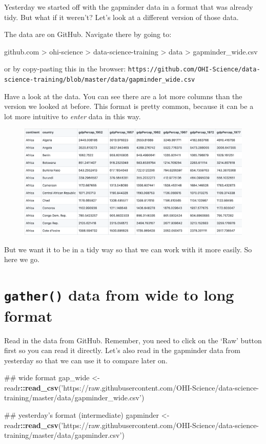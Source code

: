 \documentclass[]{book}
\newenvironment{Shaded}{\begin{snugshade}}{\end{snugshade}}
\newcommand{\KeywordTok}[1]{\textcolor[rgb]{0.13,0.29,0.53}{\textbf{#1}}}
\newcommand{\StringTok}[1]{\textcolor[rgb]{0.31,0.60,0.02}{#1}}
\newcommand{\OperatorTok}[1]{\textcolor[rgb]{0.81,0.36,0.00}{\textbf{#1}}}
\newcommand{\NormalTok}[1]{#1}
\theoremstyle{definition}
\theoremstyle{definition}
\theoremstyle{definition}
\theoremstyle{remark}
\begin{document}
Yesterday we started off with the gapminder data in a format that was
already tidy. But what if it weren't? Let's look at a different version
of those data.

The data are on GitHub. Navigate there by going to:

github.com \textgreater{} ohi-science \textgreater{}
data-science-training \textgreater{} data \textgreater{}
gapminder\_wide.csv

or by copy-pasting this in the browser:
\texttt{https://github.com/OHI-Science/data-science-training/blob/master/data/gapminder\_wide.csv}

Have a look at the data. You can see there are a lot more columns than
the version we looked at before. This format is pretty common, because
it can be a lot more intuitive to \emph{enter} data in this way.

\begin{figure}
\centering
\includegraphics{img/gapminder_wide_gh.png}
\caption{}
\end{figure}

But we want it to be in a tidy way so that we can work with it more
easily. So here we go.

\section{\texorpdfstring{\texttt{gather()} data from wide to long
format}{gather() data from wide to long format}}\label{gather-data-from-wide-to-long-format}

Read in the data from GitHub. Remember, you need to click on the `Raw'
button first so you can read it directly. Let's also read in the
gapminder data from yesterday so that we can use it to compare later on.

\begin{Shaded}
\begin{Highlighting}[]
\NormalTok{## wide format}
\NormalTok{gap_wide <-}\StringTok{ }\NormalTok{readr}\OperatorTok{::}\KeywordTok{read_csv}\NormalTok{(}\StringTok{'https://raw.githubusercontent.com/OHI-Science/data-science-training/master/data/gapminder_wide.csv'}\NormalTok{)}

\NormalTok{## yesterday's format (intermediate)}
\NormalTok{gapminder <-}\StringTok{ }\NormalTok{readr}\OperatorTok{::}\KeywordTok{read_csv}\NormalTok{(}\StringTok{'https://raw.githubusercontent.com/OHI-Science/data-science-training/master/data/gapminder.csv'}\NormalTok{)}
\end{Highlighting}
\end{Shaded}
\end{document}

